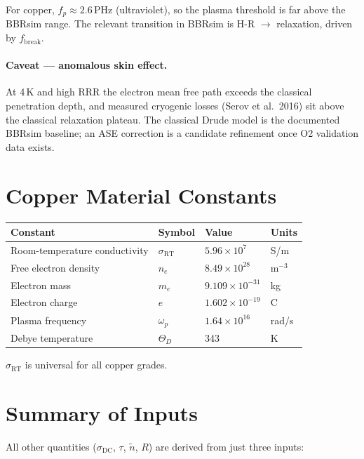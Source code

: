 \documentclass[11pt]{article}
\begin{document}
For copper, $f_p\approx 2.6$\,PHz (ultraviolet), so the plasma threshold is
far above the BBRsim range. The relevant transition in BBRsim is
H-R $\to$ relaxation, driven by $f_\mathrm{break}$.

\paragraph{Caveat — anomalous skin effect.}  At 4\,K and high RRR the electron
mean free path exceeds the classical penetration depth, and measured
cryogenic losses (Serov et al.\ 2016) sit above the classical relaxation
plateau.  The classical Drude model is the documented BBRsim baseline; an
ASE correction is a candidate refinement once O2 validation data exists.

\section{Copper Material Constants}
\label{sec:constants}

\begin{center}
\begin{tabular}{@{}llll@{}}
\toprule
Constant & Symbol & Value & Units \\
\midrule
Room-temperature conductivity & $\sigma_\mathrm{RT}$ & $5.96\times10^{7}$ & S/m \\
Free electron density & $n_e$ & $8.49\times10^{28}$ & m$^{-3}$ \\
Electron mass & $m_e$ & $9.109\times10^{-31}$ & kg \\
Electron charge & $e$ & $1.602\times10^{-19}$ & C \\
Plasma frequency & $\omega_p$ & $1.64\times10^{16}$ & rad/s \\
Debye temperature & $\Theta_D$ & 343 & K \\
\bottomrule
\end{tabular}
\end{center}
$\sigma_\mathrm{RT}$ is universal for all copper grades.

\section{Summary of Inputs}

All other quantities ($\sigma_\mathrm{DC}$, $\tau$, $\tilde{n}$, $R$) are
derived from just three inputs:
\end{document}
